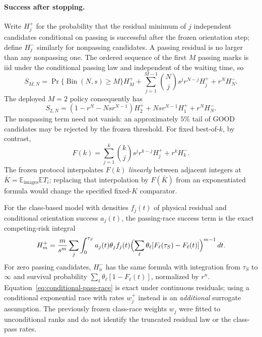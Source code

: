 \paragraph{Success after stopping.}
Write $H_j^+$ for the probability that the residual minimum of $j$
independent candidates conditional on passing is successful after the
frozen orientation step; define $H_j^-$ similarly for nonpassing
candidates. A passing residual is no larger than any nonpassing one.
The ordered sequence of the first $M$ passing marks is iid under the
conditional passing law and independent of the waiting time, so
\begin{equation}\label{eq:stop-success-general}
 S_{M,N}=\Pr\{\operatorname{Bin}(N,s)\ge M\}H_M^+
 +\sum_{j=1}^{M-1}\binom Nj s^j r^{N-j}H_j^+ +r^N H_N^-.
\end{equation}
The deployed $M=2$ policy consequently has
\begin{equation}\label{eq:stop-success-M2}
 S_{2,N}=(1-r^N-Nsr^{N-1})H_2^+
             +Nsr^{N-1}H_1^++r^NH_N^-.
\end{equation}
The nonpassing term need not vanish: an approximately $5\%$ tail of
GOOD candidates may be rejected by the frozen threshold. For fixed
best-of-$k$, by contrast,
\begin{equation}\label{eq:fixed-success-M2}
 F(k)=\sum_{j=1}^k\binom kj s^j r^{k-j}H_j^++r^kH_k^-.
\end{equation}
The frozen protocol interpolates $F(k)$ \emph{linearly} between adjacent
integers at $\bar K=\mathbb E_{\mathrm{images}}\mathbb E T_i$;
replacing that interpolation by $F(\bar K)$ from an exponentiated
formula would change the specified fixed-$K$ comparator.

For the class-based model with densities $f_j(t)$ of physical residual
and conditional orientation success $a_j(t)$, the passing-race success
term is the exact competing-risk integral
\begin{equation}\label{eq:conditional-pass-race}
 H_m^+=\frac{m}{s^m}\sum_j\int_0^{\tau_S}
 a_j(t)\theta_j f_j(t)
 \Bigl(\sum_{\ell}\theta_\ell
 [F_\ell(\tau_S)-F_\ell(t)]\Bigr)^{m-1}\,dt.
\end{equation}
For zero passing candidates, $H_n^-$ has the same formula with
integration from $\tau_S$ to $\infty$ and survival probability
$\sum_\ell\theta_\ell[1-F_\ell(t)]$, normalized by $r^n$.
Equation~\eqref{eq:conditional-pass-race} is exact under continuous
residuals; using a conditional exponential race with rates $w_j^+$
instead is an \emph{additional} surrogate assumption. The previously
frozen class-race weights $w_j$ were fitted to unconditional ranks
and do not identify the truncated residual law or the class-pass rates.

